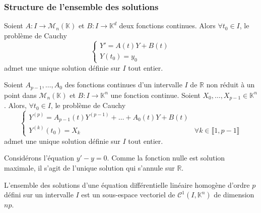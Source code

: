   \subsubsection{Structure de l'ensemble des solutions}


  \begin{theorem}
    Soient $A : I \rightarrow \mathcal{M}_n(\mathbb{K})$ et $B : I \rightarrow \mathbb{K}^d$ deux fonctions continues. Alors $\forall t_0 \in I$, le problème de Cauchy
    \[ \begin{cases} Y' = A(t)Y + B(t) \\ Y(t_0) = y_0 \end{cases} \]
    admet une unique solution définie sur $I$ tout entier.
  \end{theorem}


  \begin{remark}
    Soient $A_{p-1}, \dots, A_0$ des fonctions continues d'un intervalle $I$ de $\mathbb{R}$ non réduit à un point dans $\mathcal{M}_n(\mathbb{K})$ et $B : I \rightarrow \mathbb{K}^n$ une fonction continue. Soient $X_0, \dots, X_{p-1} \in \mathbb{K}^n$. Alors, $\forall t_0 \in I$, le problème de Cauchy
    \[ \begin{cases} Y^{(p)} = A_{p-1}(t) Y^{(p-1)} + \dots + A_0(t) Y + B(t) & \\ Y^{(k)}(t_0) = X_k & \forall k \in \llbracket 1, p-1 \rrbracket \end{cases} \]
    admet une unique solution définie sur $I$ tout entier.
  \end{remark}


  \begin{example}
    Considérons l'équation $y' - y = 0$. Comme la fonction nulle est solution maximale, il s'agit de l'unique solution qui s'annule sur $\mathbb{R}$.
  \end{example}


  \begin{corollary}
    L'ensemble des solutions d'une équation différentielle linéaire homogène d'ordre $p$ défini sur un intervalle $I$ est un sous-espace vectoriel de $\mathcal{C}^1 (I, \mathbb{K}^n)$ de dimension $np$.
  \end{corollary}


